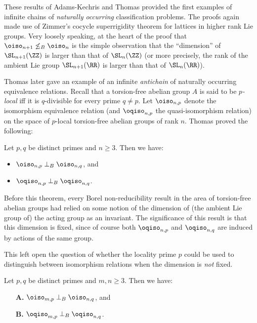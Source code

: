 \documentclass[oneside,leqno,11pt]{amsart}
\begin{document}
These results of Adams-Kechris and Thomas provided the first examples
of infinite chains of \emph{naturally occurring} classification
problems.  The proofs again made use of Zimmer's cocycle superrigidity
theorem for lattices in higher rank Lie groups.  Very loosely
speaking, at the heart of the proof that
$\oiso_{n+1}\not\leq_B\oiso_n$ is the simple observation that the
``dimension'' of $\SL_{n+1}(\ZZ)$ is larger than that of $\SL_n(\ZZ)$
(or more precisely, the rank of the ambient Lie group $\SL_{n+1}(\RR)$
is larger than that of $\SL_n(\RR)$).

Thomas later gave an example of an infinite \emph{antichain} of
naturally occurring equivalence relations.  Recall that a torsion-free
abelian group $A$ is said to be \emph{$p$-local} iff it is
$q$-divisible for every prime $q\neq p$.  Let $\oiso_{n,p}$ denote the
isomorphism equivalence relation (and $\oqiso_{n,p}$ the
quasi-isomorphism relation) on the space of $p$-local torsion-free
abelian groups of rank $n$.  Thomas proved the following:

\begin{thm*}
  Let $p,q$ be distinct primes and $n\geq3$.  Then we have:
  \begin{itemize}
  \item $\oiso_{n,p}\perp_B\oiso_{n,q}$, and
  \item $\oqiso_{n,p}\perp_B\oqiso_{n,q}$.
  \end{itemize}
\end{thm*}

Before this theorem, every Borel non-reducibility result in the area
of torsion-free abelian groups had relied on some notion of the
dimension of (the ambient Lie group of) the acting group as an
invariant.  The significance of this result is that this dimension is
fixed, since of course both $\oqiso_{n,p}$ and $\oqiso_{n,q}$ are
induced by actions of the same group.

This left open the question of whether the locality prime $p$ could be
used to distinguish between isomorphism relations when the dimension
is \emph{not} fixed.

\begin{thm*}
  Let $p,q$ be distinct primes and $m,n\geq3$.  Then we have:
  \begin{enumerate}
  \item[\textbf{A.}] $\oiso_{m,p}\perp_B\oiso_{n,q}$, and
  \item[\textbf{B.}] $\oqiso_{m,p}\perp_B\oqiso_{n,q}$.
  \end{enumerate}
\end{thm*}
\end{document}
